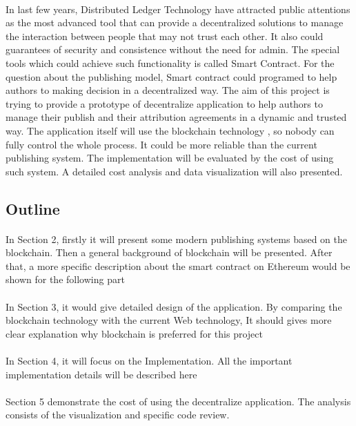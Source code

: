 \documentclass [12pt]{article}
\begin{document}
\paragraph{}In last few years, Distributed Ledger Technology have attracted public attentions as 
the most advanced tool that can provide a decentralized solutions to manage the interaction 
between people that may not trust each other. 
It also could guarantees of security and consistence without the need for admin. 
The special tools which could achieve such functionality is called Smart Contract. For the question about the publishing model,
Smart contract could programed to help authors to making decision in a decentralized way. The aim of this project is trying to provide a prototype of decentralize application 
to help authors to manage their publish and their attribution agreements in a dynamic and trusted way. 
The application itself will use the blockchain technology \cite{buterin2013ethereum}, so nobody can fully control the whole process.
It could be more reliable than the current publishing system. 
The implementation will be evaluated by the cost of using such system. 
A detailed cost analysis and data visualization will also presented.  
\subsection{Outline}
\paragraph{}In Section 2, firstly it will present some modern publishing systems based on the blockchain.  
Then a general background of blockchain will be presented. After that, 
a more specific description about the smart contract on Ethereum would be shown for the following part
\paragraph{}In Section 3, it would give detailed design of the application. 
By comparing the blockchain technology with the current Web technology, 
It should gives more clear explanation why blockchain is preferred for this project
\paragraph{}In Section 4, it will focus on the Implementation. 
All the important implementation details will be described here
\paragraph{}Section 5 demonstrate the cost of using the decentralize application. 
The analysis consists of the visualization and specific code review.
\end{document}
